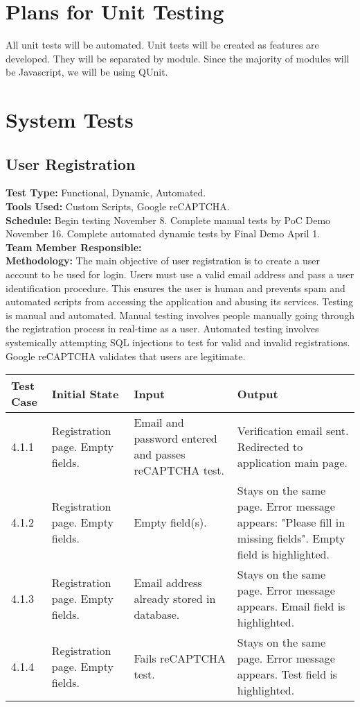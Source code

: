 \documentclass[12pt]{article}
\begin{document}
\section{Plans for Unit Testing}
All unit tests will be automated. Unit tests will be created as features are developed. They will be separated by module. Since the majority of modules will be Javascript, we will be using QUnit. 

\section{System Tests}


\subsection{User Registration} 
\textbf{Test Type:} Functional, Dynamic, Automated. \\
\textbf{Tools Used:} Custom Scripts, Google reCAPTCHA. \\
\textbf{Schedule:} Begin testing November 8. Complete manual tests by PoC Demo November 16. Complete automated dynamic tests by Final Demo April 1. \\
\textbf{Team Member Responsible:} \\
\textbf{Methodology:} The main objective of user registration is to create a user account to be used for login. Users must use a valid email address and pass a user identification procedure. This ensures the user is human and prevents spam and automated scripts from accessing the application and abusing its services. Testing is manual and automated. Manual testing involves people manually going through the registration process in real-time as a user. Automated testing involves systemically attempting SQL injections to test for valid and invalid registrations. Google reCAPTCHA validates that users are legitimate.

\begin{longtable}{|p{2cm}|p{3cm}|p{5cm}|p{5cm}|}
\hline
\textbf{Test Case}  & \textbf{Initial State} & \textbf{Input} & \textbf{Output} \\ \hline
4.1.1 & Registration page. Empty fields. & Email and password entered and passes reCAPTCHA test. & Verification email sent. Redirected to application main page. \\ 
\hline
4.1.2 & Registration page. Empty fields. & Empty field(s). & Stays on the same page. Error message appears: "Please fill in missing fields". Empty field is highlighted. \\
\hline
4.1.3 & Registration page. Empty fields. & Email address already stored in database. & Stays on the same page. Error message appears. Email field is highlighted. \\
\hline
4.1.4 & Registration page. Empty fields. & Fails reCAPTCHA test. & Stays on the same page. Error message appears. Test field is highlighted. \\
\hline
\end{longtable}
\end{document}
